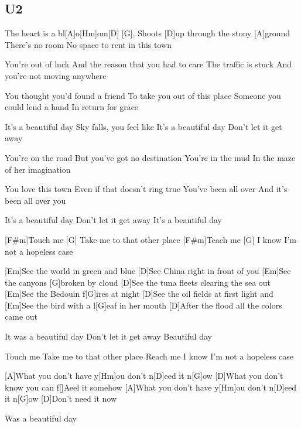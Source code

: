 \documentclass{article}
\begin{document}
\subsection*{U2}
\begin{guitar}

	
The heart is a bl[A]o[Hm]om[D] [G],
Shoots [D]up through the stony [A]ground
There's no room
No space to rent in this town

You're out of luck
And the reason that you had to care
The traffic is stuck
And you're not moving anywhere

You thought you'd found a friend
To take you out of this place
Someone you could lend a hand
In return for grace

It's a beautiful day
Sky falls, you feel like
It's a beautiful day
Don't let it get away

You're on the road
But you've got no destination
You're in the mud
In the maze of her imagination

You love this town
Even if that doesn't ring true
You've been all over
And it's been all over you

It's a beautiful day
Don't let it get away
It's a beautiful day

[F#m]Touch me [G] 
Take me to that other place
[F#m]Teach me [G] 
I know I'm not a hopeless case

[Em]See the world in green and blue
[D]See China right in front of you
[Em]See the canyons [G]broken by cloud
[D]See the tuna fleets clearing the sea out
[Em]See the Bedouin f[G]ires at night
[D]See the oil fields at first light and
[Em]See the bird with a l[G]eaf in her mouth
[D]After the flood all the colors came out

It was a beautiful day
Don't let it get away
Beautiful day

Touch me
Take me to that other place
Reach me
I know I'm not a hopeless case

[A]What you don't have y[Hm]ou don't n[D]eed it n[G]ow
[D]What you don't know you can f[]Aeel it somehow
[A]What you don't have y[Hm]ou don't n[D]eed it n[G]ow
[D]Don't need it now

Was a beautiful day 
	
\end{guitar}
\end{document}
